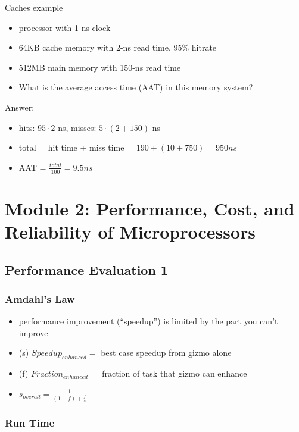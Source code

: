 \documentclass[12pt]{extarticle}
\begin{document}
	Caches example

	\begin{itemize}
		\item processor with 1-ns clock
		\item 64KB cache memory with 2-ns read time, 95\% hitrate
		\item 512MB main memory with 150-ns read time
		\item What is the average access time (AAT) in this memory system?
	\end{itemize}

	Answer:
	\begin{itemize}
		\item hits: $95 \cdot 2$ ns, misses: $5 \cdot (2 + 150)$ ns
		\item total = hit time + miss time = $190 + (10 + 750) = 950 ns$
		\item AAT = $\frac{total}{100} = 9.5ns$
	\end{itemize}

	\section{Module 2: Performance, Cost, and Reliability of Microprocessors}

	\subsection{Performance Evaluation 1}

	\subsubsection{Amdahl's Law}

	\begin{itemize}
		\item performance improvement (``speedup'') is limited by the part you can't improve
		\item (s) $Speedup_{enhanced} =$ best case speedup from gizmo alone
		\item (f) $Fraction_{enhanced} =$ fraction of task that gizmo can enhance
		\item $s_{overall} = \frac{1}{(1 - f) + \frac{f}{s}}$
	\end{itemize}

	\subsubsection{Run Time}
\end{document}
